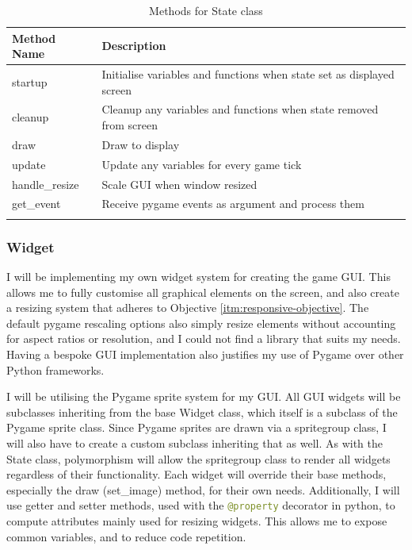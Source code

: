 \documentclass[../main/main.tex]{subfiles}
\begin{document}
\begin{longtable}[c]{l|l}
    \toprule
    \textbf{Method Name} & \textbf{Description}\\
    \midrule
    \endfirsthead
    \endhead

    startup & Initialise variables and functions when state set as displayed screen\\
    cleanup & Cleanup any variables and functions when state removed from screen\\
    draw & Draw to display\\
    update & Update any variables for every game tick\\
    handle\_resize & Scale GUI when window resized\\
    get\_event & Receive pygame events as argument and process them\\

    \bottomrule

\caption{Methods for State class}
\label{tab:state-methods}
\end{longtable}

\subsubsection*{Widget}
\label{sec:design-widgets}
I will be implementing my own widget system for creating the game GUI. This allows me to fully customise all graphical elements on the screen, and also create a resizing system that adheres to Objective \ref{itm:responsive-objective}. The default pygame rescaling options also simply resize elements without accounting for aspect ratios or resolution, and I could not find a library that suits my needs. Having a bespoke GUI implementation also justifies my use of Pygame over other Python frameworks.

I will be utilising the Pygame sprite system for my GUI. All GUI widgets will be subclasses inheriting from the base Widget class, which itself is a subclass of the Pygame sprite class.
Since Pygame sprites are drawn via a spritegroup class, I will also have to create a custom subclass inheriting that as well. As with the State class, polymorphism will allow the spritegroup class to render all widgets regardless of their functionality. Each widget will override their base methods, especially the draw (set\_image) method, for their own needs. Additionally, I will use getter and setter methods, used with the \lstinline[language=Python]{@property} decorator in python, to compute attributes mainly used for resizing widgets. This allows me to expose common variables, and to reduce code repetition.
\end{document}
